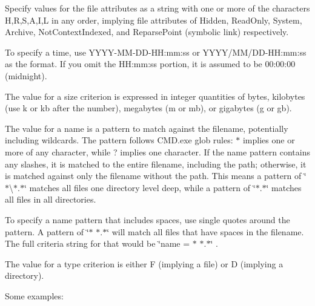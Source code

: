 Specify values for the file attributes as a string with one or more of the characters H,R,S,A,I,L in any order, implying file attributes of Hidden, Read\+Only, System, Archive, Not\+Context\+Indexed, and Reparse\+Point (symbolic link) respectively. 

To specify a time, use Y\+Y\+Y\+Y-\/\+M\+M-\/\+D\+D-\/\+HH\+:mm\+:ss or Y\+Y\+Y\+Y/\+M\+M/\+D\+D-\/\+HH\+:mm\+:ss as the format. If you omit the H\+H\+:mm\+:ss portion, it is assumed to be 00\+:00\+:00 (midnight). 

The value for a size criterion is expressed in integer quantities of bytes, kilobytes (use k or kb after the number), megabytes (m or mb), or gigabytes (g or gb). 

The value for a name is a pattern to match against the filename, potentially including wildcards. The pattern follows C\+M\+D.\+exe glob rules\+: $\ast$ implies one or more of any character, while ? implies one character. If the name pattern contains any slashes, it is matched to the entire filename, including the path; otherwise, it is matched against only the filename without the path. This means a pattern of \char`\"{}$\ast$\textbackslash{}$\ast$.$\ast$\char`\"{} matches all files one directory level deep, while a pattern of \char`\"{}$\ast$.$\ast$\char`\"{} matches all files in all directories. 

To specify a name pattern that includes spaces, use single quotes around the pattern. A pattern of \char`\"{}\textquotesingle{}$\ast$ $\ast$.$\ast$\textquotesingle{}\char`\"{} will match all files that have spaces in the filename. The full criteria string for that would be \char`\"{}name = \textquotesingle{}$\ast$ $\ast$.$\ast$\textquotesingle{}\char`\"{} . 

The value for a type criterion is either F (implying a file) or D (implying a directory). 

Some examples\+: 

